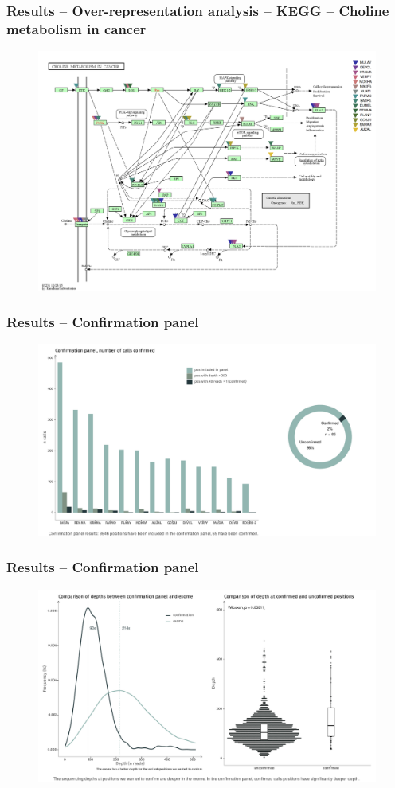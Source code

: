 \documentclass[aspectratio=169, 9pt]{beamer}
\begin{document}
\begin{frame}
    \frametitle{ Results -- Over-representation analysis -- KEGG -- Choline metabolism in cancer}
    \begin{figure}
        \includegraphics[width=.8\textwidth]{Images/hsa05231.png}
    \end{figure}
\end{frame}

\begin{frame}
    \frametitle{ Results -- Confirmation panel}
    \begin{figure}
        \includegraphics[width=.95  \textwidth]{Images/confirm_1.pdf}
    \end{figure}
\end{frame}

\begin{frame}
    \frametitle{ Results -- Confirmation panel}
    \begin{figure}
        \includegraphics[width=.95  \textwidth]{Images/confirm_2.pdf}
    \end{figure}
\end{frame}
\end{document}
